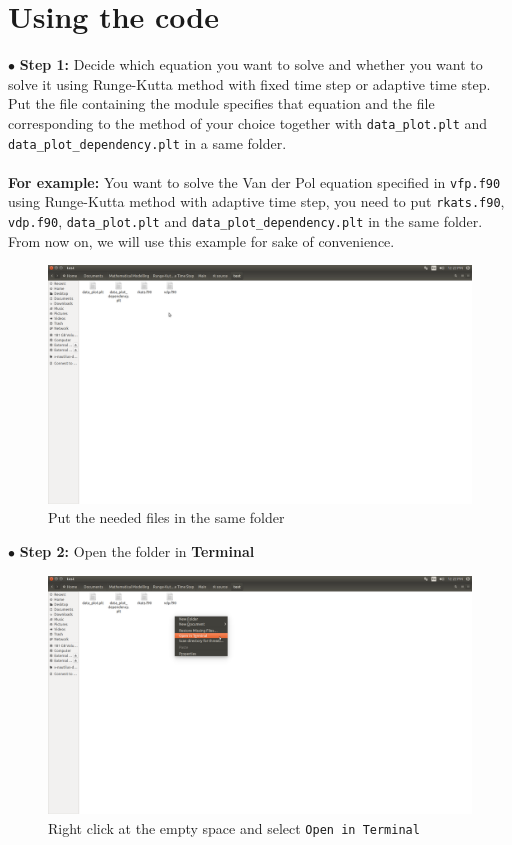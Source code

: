 \documentclass{article}
\begin{document}
	\section{Using the code}
	$\bullet$ \textbf{Step 1:} Decide which equation you want to solve and whether you want to solve it using Runge-Kutta method with fixed time step or adaptive time step. Put the file containing the module specifies that equation and the file corresponding to the method of your choice together with \texttt{data\_plot.plt} and \texttt{data\_plot\_dependency.plt} in a same folder.\\\\
	\textbf{For example:} You want to solve the Van der Pol equation specified in \texttt{vfp.f90} using Runge-Kutta method with adaptive time step, you need to put \texttt{rkats.f90}, \texttt{vdp.f90}, \texttt{data\_plot.plt} and \texttt{data\_plot\_dependency.plt} in the same folder. From now on, we will use this example for sake of convenience.
	\begin{figure}[H]
		\centering	\includegraphics[width=15cm]{fig1}
		\caption{Put the needed files in the same folder}
	\end{figure}
	\noindent$\bullet$ \textbf{Step 2:} Open the folder in \textbf{Terminal}
	\begin{figure}[H]
		\centering	\includegraphics[width=15cm]{fig2}
		\caption{Right click at the empty space and select \texttt{Open in Terminal}}
	\end{figure}
\end{document}
